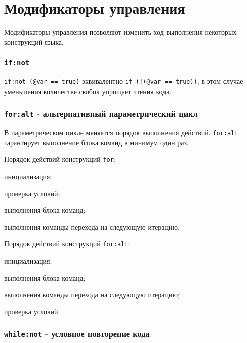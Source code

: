 
\section{Модификаторы управления}

\label{sec-modifiers}

Модификаторы управления позволяют изменить ход выполнения некоторых конструкций языка.

\subsubsection{\lstinline|if:not|}

\lstinline|if:not (@var == true)| эквивалентно \lstinline|if (!(@var == true))|, в этом случае уменьшения количестве скобок упрощает чтения кода.

\subsubsection{\lstinline|for:alt| - альтернативный параметрический цикл}

В параметрическом цикле меняется порядок выполнения действий. \lstinline|for:alt| гарантирует выполнение блока команд в минимум один раз.

Порядок действий конструкций \lstinline|for|:
\begin{icEnum}
    \item инициализация;
	\item проверка условий;
	\item выполнения блока команд;
	\item выполнения команды перехода на следующую итерацию.
\end{icEnum}

Порядок действий конструкций \lstinline|for:alt|:
\begin{icEnum}
    \item инициализация;
	\item выполнения блока команд;
	\item выполнения команды перехода на следующую итерацию;
	\item проверка условий.
\end{icEnum}

\subsubsection{\lstinline|while:not| - условное повторение кода}

